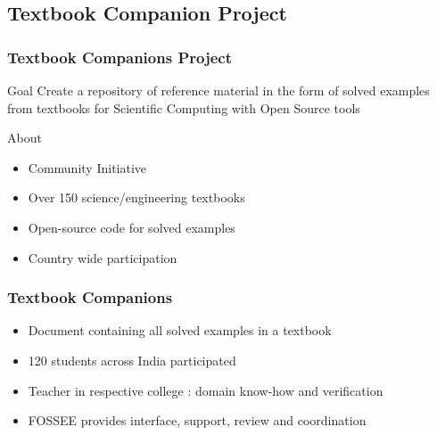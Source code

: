 \documentclass[compress,red]{beamer} %
\begin{document}
\subsection{Textbook Companion Project}

\begin{frame}
\frametitle{Textbook Companions Project}
\begin{block}{Goal}
Create a repository of reference material in the form of solved examples from textbooks for Scientific Computing with Open Source tools \pause
\end{block}
\begin{block}{About}
\begin{itemize}
	\item Community Initiative \pause
    \item Over 150 science/engineering textbooks \pause
    \item Open-source code for solved examples \pause
    \item \alert{Country wide participation}
\end{itemize}
\end{block}
\end{frame}

\begin{frame}
\frametitle{Textbook Companions}
\begin{itemize}
\item Document containing all solved examples in a textbook \pause 
\item 120 students across India participated \pause
\item Teacher in respective college : domain know-how and verification \pause
\item \alert{FOSSEE} provides interface, support, review and coordination
\end{itemize}
\end{frame}
\end{document}
